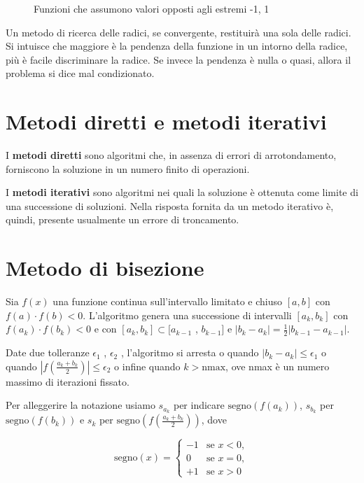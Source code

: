 \documentclass[10pt]{article}
\begin{document}
\begin{figure}[ht]
    \centering
    
    \caption{Funzioni che assumono valori opposti agli estremi -1, 1}
    \label{fig:ipotesibolzano}
\end{figure}

Un metodo di ricerca delle radici, se convergente, restituirà una sola delle radici.
Si intuisce che maggiore è la pendenza della funzione in un intorno della radice, più è facile discriminare la radice. Se invece la pendenza è nulla o quasi, allora il problema si dice mal condizionato.

\section{Metodi diretti e metodi iterativi}

I \textbf{metodi diretti} sono algoritmi che, in assenza di errori di arrotondamento, forniscono la soluzione in un numero finito di operazioni.

I \textbf{metodi iterativi} sono algoritmi nei quali la soluzione è ottenuta come limite di una successione di soluzioni. Nella risposta fornita da un metodo iterativo è, quindi, presente usualmente un errore di troncamento.


\section{Metodo di bisezione}

Sia $f (x)$ una funzione continua sull'intervallo limitato e chiuso $[a, b]$ con $f (a) \cdot f (b) < 0$. L'algoritmo genera una successione di intervalli
$[a_k , b_k]$ con $f (a_k ) \cdot f (b_k ) < 0$ e con $[a_k , b_k ] \subset [a_{k-1}$ , $b_{k-1} ]$ e $|b_k - a_k | = \frac{1}{2}|b_{k-1} - a_{k-1} |$. 

Date due tolleranze $\epsilon_1$ , $\epsilon_2$ , l’algoritmo si arresta o quando $|b_k - a_k | \leq \epsilon_1$ o quando $|f (\frac {a_k +b_k}{2} )| \leq
\epsilon_2$ o infine quando $k > \text{nmax}$, ove nmax è un numero massimo di iterazioni fissato.

Per alleggerire la notazione usiamo $s_{a_k}$ per indicare $\mathrm{segno} \left(f\left(a_k\right)\right)$,
$s_{b_k}$ per $\mathrm{segno}(f(b_k))$ e
$s_k$ per $\mathrm{segno}(f (\frac {a_k +b_k}{2}))$, dove

\begin{equation}
    \mathrm{segno}(x) =
    \begin{cases}
        -1 & \text{se } x < 0, \\
         0 & \text{{se }} x = 0, \\
        +1 & \text{{se }} x > 0
    \end{cases}
\end{equation}
\end{document}
